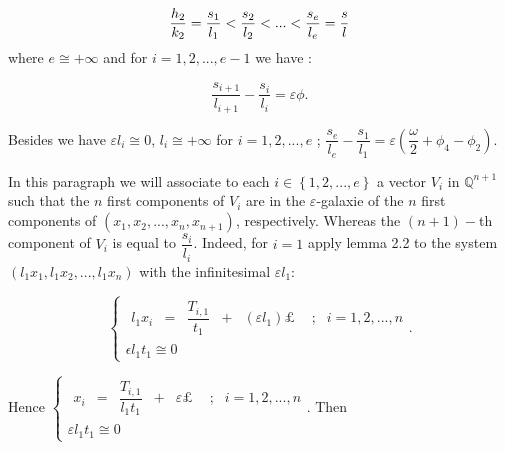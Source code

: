 \documentclass[12pt]{article}
\begin{document}
\begin{equation*}
\dfrac{h_{2}}{k_{2}}=\dfrac{s_{1}}{l_{1}}<\dfrac{s_{2}}{l_{2}}<...<\dfrac{%
s_{e}}{l_{e}}=\dfrac{s}{l}
\end{equation*}%
where $e\cong +\infty $ and for $i=1,2,...,e-1$ we have :

\begin{equation*}
\dfrac{s_{i+1}}{l_{i+1}}-\dfrac{s_{i}}{l_{i}}=\varepsilon \phi \text{.}
\end{equation*}

\noindent Besides we have $\varepsilon l_{i}\cong 0$, $l_{i}\cong +\infty $
for $i=1,2,...,e$ ; $\dfrac{s_{e}}{l_{e}}-\dfrac{s_{1}}{l_{1}}=\varepsilon
\left( \dfrac{\omega }{2}+\phi _{4}-\phi _{2}\right) $.

In this paragraph we will associate to each $i\in \left\{ 1,2,...,e\right\} $
a vector $V_{i}$ in $\mathbb{Q}^{n+1}$ such that the $n$ first components of 
$V_{i}$ are in the $\varepsilon $-galaxie of the $n$ first components of $%
\left( x_{1},x_{2},...,x_{n},x_{n+1}\right) $, respectively. Whereas the $%
\left( n+1\right) -$th component of $V_{i}$ is equal to $\dfrac{s_{i}}{l_{i}}
$. Indeed, for $i=1$ apply lemma 2.2 to the system $\left(
l_{1}x_{1},l_{1}x_{2},...,l_{1}x_{n}\right) $ with the infinitesimal $%
\varepsilon l_{1}$:

\begin{equation*}
\left\{ 
\begin{array}{ccc}
\begin{array}{lllll}
l_{1}x_{i} & = & \dfrac{T_{i,1}}{t_{1}} & + & \left( \varepsilon
l_{1}\right) \pounds 
\end{array}
& ; & i=1,2,...,n \\ 
\epsilon l_{1}t_{1}\cong 0 &  & 
\end{array}%
\text{.}\right.
\end{equation*}

\noindent Hence $\left\{ 
\begin{array}{ccc}
\begin{array}{lllll}
x_{i} & = & \dfrac{T_{i,1}}{l_{1}t_{1}} & + & \varepsilon \pounds 
\end{array}
& ; & i=1,2,...,n \\ 
\varepsilon l_{1}t_{1}\cong 0 &  & 
\end{array}%
\text{.}\right. $ Then
\end{document}
